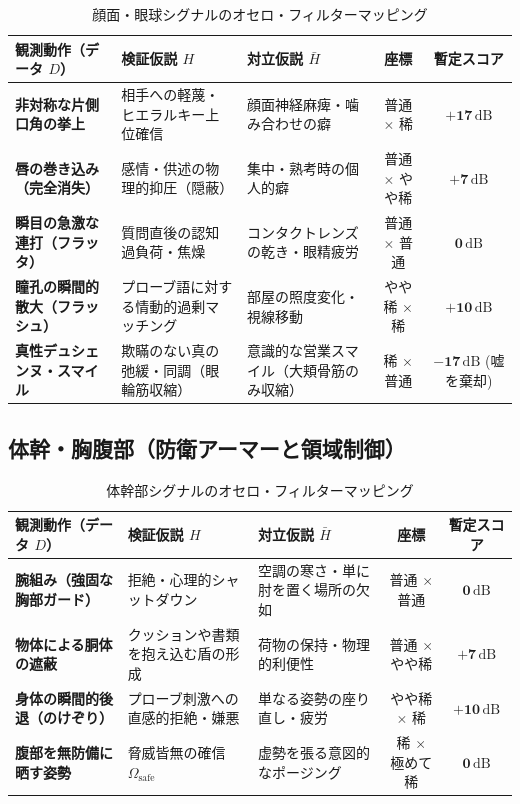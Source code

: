 \begin{table}[htbp]
\centering
\small
\caption{顔面・眼球シグナルのオセロ・フィルターマッピング}
\label{tab:dict_face_eyes}
\begin{tabular}{p{3.8cm}p{3.6cm}p{3.6cm}cc}
\toprule
\textbf{観測動作（データ $D$）} & \textbf{検証仮説 $H$} & \textbf{対立仮説 $\bar{H}$} & \textbf{座標} & \textbf{暫定スコア} \\
\midrule
\textbf{非対称な片側口角の挙上} & 相手への軽蔑・ヒエラルキー上位確信 & 顔面神経麻痺・噛み合わせの癖 & 普通 $\times$ 稀 & $\mathbf{+17\,\mathrm{dB}}$ \\
\textbf{唇の巻き込み（完全消失）} & 感情・供述の物理的抑圧（隠蔽） & 集中・熟考時の個人的癖 & 普通 $\times$ やや稀 & $\mathbf{+7\,\mathrm{dB}}$ \\
\textbf{瞬目の急激な連打（フラッタ）} & 質問直後の認知過負荷・焦燥 & コンタクトレンズの乾き・眼精疲労 & 普通 $\times$ 普通 & $\mathbf{0\,\mathrm{dB}}$ \\
\textbf{瞳孔の瞬間的散大（フラッシュ）} & プローブ語に対する情動的過剰マッチング & 部屋の照度変化・視線移動 & やや稀 $\times$ 稀 & $\mathbf{+10\,\mathrm{dB}}$ \\
\textbf{真性デュシェンヌ・スマイル} & 欺瞞のない真の弛緩・同調（眼輪筋収縮） & 意識的な営業スマイル（大頬骨筋のみ収縮） & 稀 $\times$ 普通 & $\mathbf{-17\,\mathrm{dB}}$ (嘘を棄却) \\
\bottomrule
\end{tabular}
\end{table}

\subsection{体幹・胸腹部（防衛アーマーと領域制御）}

\begin{table}[htbp]
\centering
\small
\caption{体幹部シグナルのオセロ・フィルターマッピング}
\label{tab:dict_torso}
\begin{tabular}{p{3.8cm}p{3.6cm}p{3.6cm}cc}
\toprule
\textbf{観測動作（データ $D$）} & \textbf{検証仮説 $H$} & \textbf{対立仮説 $\bar{H}$} & \textbf{座標} & \textbf{暫定スコア} \\
\midrule
\textbf{腕組み（強固な胸部ガード）} & 拒絶・心理的シャットダウン & 空調の寒さ・単に肘を置く場所の欠如 & 普通 $\times$ 普通 & $\mathbf{0\,\mathrm{dB}}$ \\
\textbf{物体による胴体の遮蔽} & クッションや書類を抱え込む盾の形成 & 荷物の保持・物理的利便性 & 普通 $\times$ やや稀 & $\mathbf{+7\,\mathrm{dB}}$ \\
\textbf{身体の瞬間的後退（のけぞり）} & プローブ刺激への直感的拒絶・嫌悪 & 単なる姿勢の座り直し・疲労 & やや稀 $\times$ 稀 & $\mathbf{+10\,\mathrm{dB}}$ \\
\textbf{腹部を無防備に晒す姿勢} & 脅威皆無の確信 $\Omega_{\mathrm{safe}}$ & 虚勢を張る意図的なポージング & 稀 $\times$ 極めて稀 & $\mathbf{0\,\mathrm{dB}}$ \\
\bottomrule
\end{tabular}
\end{table}

